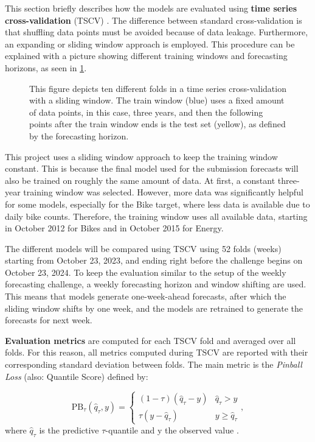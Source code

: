 This section briefly describes how the models are evaluated using \textbf{time series cross-validation} (TSCV) \parencite[Chapter~5.10]{hyndman_forecasting_2021}. The difference between standard cross-validation \parencite[241--248]{hastie_elements_2009} is that shuffling data points must be avoided because of data leakage. Furthermore, an expanding or sliding window approach is employed. This procedure can be explained with a picture showing different training windows and forecasting horizons, as seen in \cref{fig:tscv}.
\begin{figure}[htbp]
    \centering
    
    \caption{This figure depicts ten different folds in a time series cross-validation with a sliding window. The train window (blue) uses a fixed amount of data points, in this case, three years, and then the following points after the train window ends is the test set (yellow), as defined by the forecasting horizon.}
    \label{fig:tscv}
\end{figure}
This project uses a sliding window approach to keep the training window constant. This is because the final model used for the submission forecasts will also be trained on roughly the same amount of data. At first, a constant three-year training window was selected. However, more data was significantly helpful for some models, especially for the Bike target, where less data is available due to daily bike counts. Therefore, the training window uses all available data, starting in October 2012 for Bikes and in October 2015 for Energy.

The different models will be compared using TSCV using 52 folds (weeks) starting from October 23, 2023, and ending right before the challenge begins on October 23, 2024. To keep the evaluation similar to the setup of the weekly forecasting challenge, a weekly forecasting horizon and window shifting are used. This means that models generate one-week-ahead forecasts, after which the sliding window shifts by one week, and the models are retrained to generate the forecasts for next week.

\textbf{Evaluation metrics} are computed for each TSCV fold and averaged over all folds. For this reason, all metrics computed during TSCV are reported with their corresponding standard deviation between folds. The main metric is the \textit{Pinball Loss} (also: Quantile Score) defined by:

\begin{equation}
\label{eq:PinballLoss}
\text{PB}_{\tau}(\hat{q}_{\tau}, y) = 
\begin{cases} 
(1 - \tau) (\hat{q}_{\tau} - y) & \hat{q}_{\tau} > y \\
\tau (y - \hat{q}_{\tau}) & y \geq \hat{q}_{\tau}
\end{cases}
,
\end{equation}
where $\hat{q}_\tau$ is the predictive $\tau$-quantile and y the observed value \parencite[Chapter~5.9]{hyndman_forecasting_2021}.

